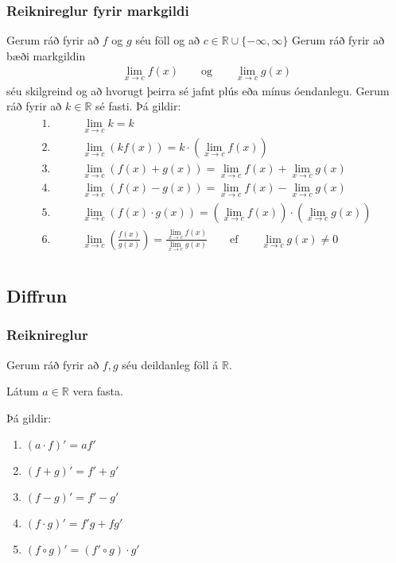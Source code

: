 \documentclass[a4paper,10pt,icelandic]{sphinxmanual}
\begin{document}
\subsubsection{Reiknireglur fyrir markgildi}
\label{\detokenize{Kafli12:reiknireglur-fyrir-markgildi}}
Gerum ráð fyrir að \(f\) og \(g\) séu föll og að \(c\in \mathbb{R} \cup\{-\infty,\infty\}\)
Gerum ráð fyrir að bæði markgildin
\begin{equation*}
\begin{split}\lim_{x\to c}f(x)\qquad \text{og}\qquad \lim_{x\to c}g(x)\end{split}
\end{equation*}
séu skilgreind og að hvorugt þeirra sé jafnt plús eða mínus óendanlegu.
Gerum ráð fyrir að \(k\in\mathbb{R}\) sé fasti.
Þá gildir:
\begin{align*}\!\begin{aligned}
1. & \qquad \lim_{x\to c}k=k\\
2. & \qquad \lim_{x\to c} \left(kf(x) \right)=k \cdot \left(\lim_{x\to c}f(x)\right)\\
3. & \qquad \lim_{x\to c} \left(f(x)+g(x)\right)=\lim_{x\to c}f(x)+\lim_{x\to c}g(x)\\
4. & \qquad \lim_{x\to c} \left(f(x)-g(x)\right)=\lim_{x\to c}f(x)-\lim_{x\to c}g(x)\\
5. & \qquad \lim_{x\to c} \left(f(x)\cdot g(x)\right)= \left( \lim_{x\to c}f(x) \right)\cdot \left(\lim_{x\to c}g(x) \right)\\
6. & \qquad \lim_{x\to c} \left( \frac{f(x)}{g(x)} \right)=\frac{\lim_{x\to c}f(x)}{\lim_{x\to c}g(x)} \qquad \text{ef} \qquad \lim_{x\to c}g(x)\not=0\\
\end{aligned}\end{align*}

\subsection{Diffrun}
\label{\detokenize{Kafli12:diffrun}}

\subsubsection{Reiknireglur}
\label{\detokenize{Kafli12:id1}}
Gerum ráð fyrir að \(f,g\) séu deildanleg föll á \(\mathbb{R}\).

Látum \(a\in \mathbb{R}\) vera fasta.

Þá gildir:
\begin{enumerate}
%
\item {} 
\((a\cdot f)'=af'\)

\item {} 
\((f+g)'=f'+g'\)

\item {} 
\((f-g)'=f'-g'\)

\item {} 
\((f\cdot g)'=f'g+fg'\)

\item {} 
\((f\circ g)'=(f'\circ g)\cdot g'\)

\end{enumerate}
\end{document}
